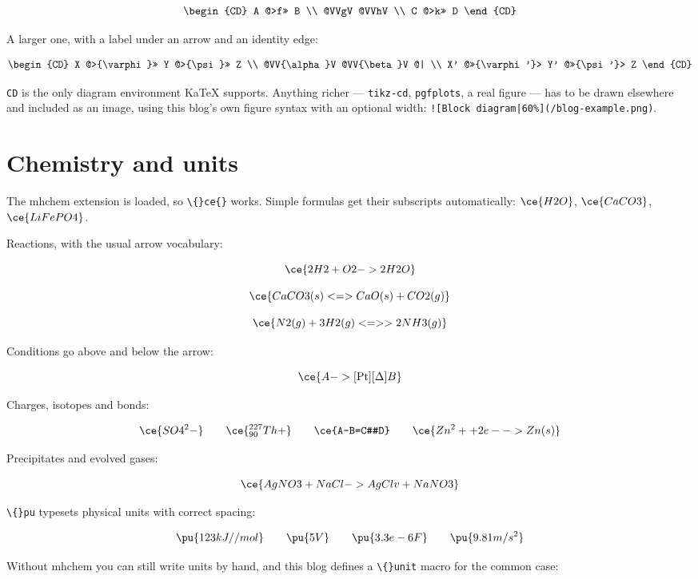 \[
\begin{CD}
A @>f>> B \\
@VVgV @VVhV \\
C @>k>> D
\end{CD}
\]

A larger one, with a label under an arrow and an identity edge:

\[
\begin{CD}
X @>{\varphi}>> Y @>{\psi}>> Z \\
@VV{\alpha}V @VV{\beta}V @| \\
X' @>>{\varphi'}> Y' @>>{\psi'}> Z
\end{CD}
\]

\texttt{CD} is the only diagram environment KaTeX supports. Anything richer — \texttt{tikz-cd}, \texttt{pgfplots}, a real figure — has to be drawn elsewhere and included as an image, using this blog's own figure syntax with an optional width: \texttt{![Block diagram|60\%](/blog-example.png)}.

\section{Chemistry and units}

The mhchem extension is loaded, so \texttt{\textbackslash\{\}ce\{\}} works. Simple formulas get their subscripts automatically: $\ce{H2O}$, $\ce{CaCO3}$, $\ce{LiFePO4}$.

Reactions, with the usual arrow vocabulary:

\[
\ce{2H2 + O2 -> 2H2O}
\]

\[
\ce{CaCO3(s) <=> CaO(s) + CO2(g)}
\]

\[
\ce{N2(g) + 3H2(g) <=>> 2NH3(g)}
\]

Conditions go above and below the arrow:

\[
\ce{A ->[\text{Pt}][\Delta] B}
\]

Charges, isotopes and bonds:

\[
\ce{SO4^2-} \qquad \ce{^{227}_{90}Th+} \qquad \ce{A-B=C#D} \qquad \ce{Zn^2+ + 2e- -> Zn(s)}
\]

Precipitates and evolved gases:

\[
\ce{AgNO3 + NaCl -> AgCl v + NaNO3}
\]

\texttt{\textbackslash\{\}pu} typesets physical units with correct spacing:

\[
\pu{123 kJ//mol} \qquad \pu{5 V} \qquad \pu{3.3e-6 F} \qquad \pu{9.81 m/s^2}
\]

Without mhchem you can still write units by hand, and this blog defines a \texttt{\textbackslash\{\}unit} macro for the common case:

